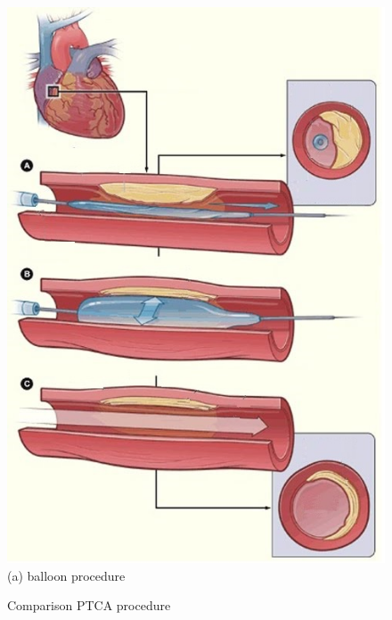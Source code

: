 \begin{figure}[H]
     \caption{Comparison PTCA procedure}
     \begin{minipage}{.50\linewidth}
      \centering
      \includegraphics[scale=0.5]{./02_chaps/cap_review/figure/balloon.jpg}\\
      (a) balloon procedure
     \end{minipage}%
     \begin{minipage}{.50\linewidth}
      \centering

\end{minipage}
\end{figure}
